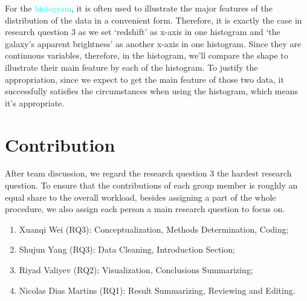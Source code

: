 \documentclass[12pt]{article}
\begin{document}
\noindent For the \textcolor{cyan}{histogram}, it is often used to illustrate the major features of the distribution of the data in a convenient form. Therefore, it is exactly the case in research question 3 as we set `redshift' as x-axis in one histogram and `the galaxy's apparent brightness' as another x-axis in one histogram. Since they are continuous variables, therefore, in the histogram, we'll compare the shape to illustrate their main feature by each of the histogram. To justify the appropriation, since we expect to get the main feature of those two data, it successfully satisfies the circumstances when using the histogram, which means it's appropriate.

\section{Contribution}
After team discussion, we regard the research question 3 the hardest research question. To ensure that the contributions of each group member is roughly an equal share to the overall workload, besides assigning a part of the whole procedure, we also assign each person a main research question to focus on. 

\begin{enumerate}
	\item Xuanqi Wei (RQ3): Conceptualization, Methods Determination, Coding;
	\item Shujun Yang (RQ3): Data Cleaning, Introduction Section;
	\item Riyad Valiyev (RQ2): Visualization, Conclusions Summarizing;
	\item Nicolas Dias Martins (RQ1): Result Summarizing, Reviewing and Editing.
\end{enumerate}
\end{document}
